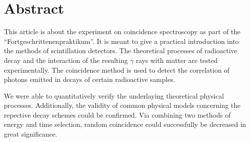 \section*{Abstract}
%
This article is about the experiment on coincidence spectroscopy as part of the \enquote{Fortgeschrittenenpraktikum}.
It is meant to give a practical introduction into the methods of scintillation detectors.
The theoretical processes of radioactive decay and the interaction of the resulting $\gamma$ rays with matter are tested experimentally.
The coincidence method is used to detect the correlation of photons emitted in decays of certain radioactive samples.
%
\par
%
We were able to quantitatively verify the underlaying theoretical physical processes.
Additionally, the validity of common physical models concerning the repective decay schemes could be confirmed.
Via combining two methods of energy and time selection, random coincidence could successfully be decreased in great significance.
